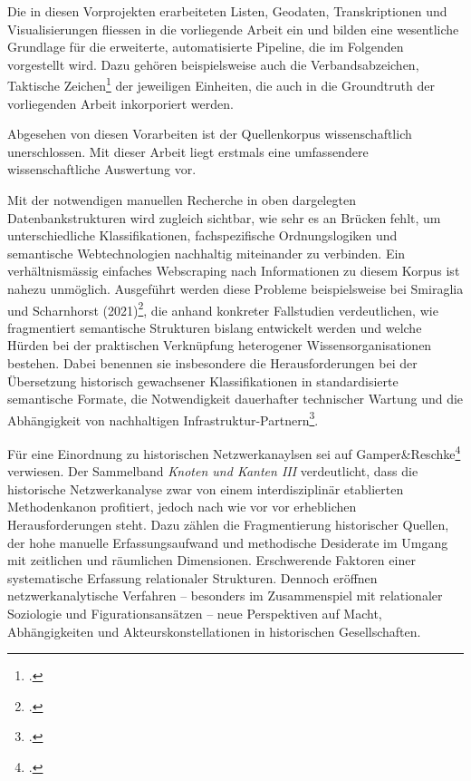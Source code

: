 \documentclass[12pt, a4paper, ngerman, bidi=default]{article}
\let\cite\footcite
\begin{document}
Die in diesen Vorprojekten erarbeiteten Listen, Geodaten, Transkriptionen und Visualisierungen fliessen in die vorliegende Arbeit ein
und bilden eine wesentliche Grundlage für die erweiterte, automatisierte Pipeline, die im Folgenden vorgestellt wird. Dazu gehören beispielsweise auch die Verbandsabzeichen, 
Taktische Zeichen\cite[vgl.][S.64-66]{haupt_buch_1982} der jeweiligen Einheiten, die auch in die Groundtruth der vorliegenden Arbeit inkorporiert werden.

Abgesehen von diesen Vorarbeiten ist der Quellenkorpus wissenschaftlich unerschlossen. Mit dieser Arbeit liegt erstmals eine
umfassendere wissenschaftliche Auswertung vor.

Mit der notwendigen manuellen Recherche in oben dargelegten Datenbankstrukturen wird zugleich sichtbar, wie sehr es an Brücken fehlt, 
um unterschiedliche Klassifikationen, fachspezifische Ordnungslogiken und semantische Webtechnologien nachhaltig miteinander zu verbinden. Ein verhältnismässig einfaches
Webscraping nach Informationen zu diesem Korpus ist nahezu unmöglich. Ausgeführt werden diese Probleme beispielsweise bei 
Smiraglia und Scharnhorst (2021)\cite[vgl.][]{richard_linking_2022}, 
 die anhand konkreter Fallstudien verdeutlichen, wie fragmentiert semantische Strukturen bislang entwickelt werden 
 und welche Hürden bei der praktischen Verknüpfung heterogener Wissensorganisationen bestehen. Dabei benennen sie insbesondere die 
 Herausforderungen bei der Übersetzung historisch gewachsener Klassifikationen in standardisierte semantische Formate, 
 die Notwendigkeit dauerhafter technischer Wartung und die Abhängigkeit von nachhaltigen Infrastruktur-Partnern\cite[vgl.][Kap. 2 und 5]{richard_linking_2022}.

Für eine Einordnung zu historischen Netzwerkanaylsen sei auf Gamper\&Reschke\cite{gamper_knoten_2015} verwiesen. Der Sammelband
\textit{Knoten und Kanten III} verdeutlicht, dass die historische Netzwerkanalyse zwar von einem interdisziplinär etablierten Methodenkanon 
profitiert, jedoch nach wie vor vor erheblichen Herausforderungen steht. Dazu zählen die Fragmentierung historischer Quellen, der hohe manuelle 
Erfassungsaufwand und methodische Desiderate im Umgang mit zeitlichen und räumlichen Dimensionen. Erschwerende Faktoren einer systematische Erfassung 
relationaler Strukturen. Dennoch eröffnen netzwerkanalytische Verfahren – besonders im Zusammenspiel mit relationaler Soziologie 
und Figurationsansätzen – neue Perspektiven auf Macht, Abhängigkeiten und Akteurskonstellationen in historischen Gesellschaften.
\end{document}
